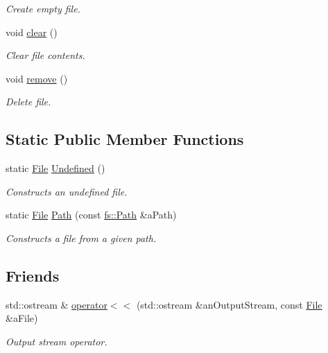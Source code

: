 \begin{DoxyCompactItemize}
\begin{DoxyCompactList}\small\item\em Create empty file. \end{DoxyCompactList}\item 
void \mbox{\hyperlink{classlibrary_1_1core_1_1fs_1_1_file_a0b95ab08dd8df2cc28b2e42a72ae0b9a}{clear}} ()
\begin{DoxyCompactList}\small\item\em Clear file contents. \end{DoxyCompactList}\item 
void \mbox{\hyperlink{classlibrary_1_1core_1_1fs_1_1_file_a438408d402b994d76d4de3829ec67dbc}{remove}} ()
\begin{DoxyCompactList}\small\item\em Delete file. \end{DoxyCompactList}\end{DoxyCompactItemize}
\subsection*{Static Public Member Functions}
\begin{DoxyCompactItemize}
\item 
static \mbox{\hyperlink{classlibrary_1_1core_1_1fs_1_1_file}{File}} \mbox{\hyperlink{classlibrary_1_1core_1_1fs_1_1_file_af45fa5c36c359a979149845ef06586e6}{Undefined}} ()
\begin{DoxyCompactList}\small\item\em Constructs an undefined file. \end{DoxyCompactList}\item 
static \mbox{\hyperlink{classlibrary_1_1core_1_1fs_1_1_file}{File}} \mbox{\hyperlink{classlibrary_1_1core_1_1fs_1_1_file_a72d6cdf8bb7e299889c6149e2b8a6cc7}{Path}} (const \mbox{\hyperlink{classlibrary_1_1core_1_1fs_1_1_path}{fs\+::\+Path}} \&a\+Path)
\begin{DoxyCompactList}\small\item\em Constructs a file from a given path. \end{DoxyCompactList}\end{DoxyCompactItemize}
\subsection*{Friends}
\begin{DoxyCompactItemize}
\item 
std\+::ostream \& \mbox{\hyperlink{classlibrary_1_1core_1_1fs_1_1_file_a82ce9f27653427d53ecb90de978f4f68}{operator$<$$<$}} (std\+::ostream \&an\+Output\+Stream, const \mbox{\hyperlink{classlibrary_1_1core_1_1fs_1_1_file}{File}} \&a\+File)
\begin{DoxyCompactList}\small\item\em Output stream operator. \end{DoxyCompactList}\end{DoxyCompactItemize}


